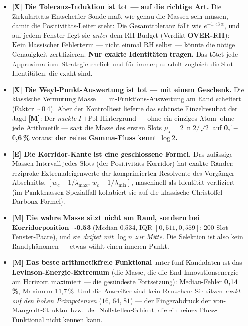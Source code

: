 \documentclass[11pt,a4paper]{article}
\newcommand{\E}{\textcolor{gut}{\textbf{[E]}}}
\newcommand{\M}{\textcolor{mess}{\textbf{[M]}}}
\begin{document}
\begin{itemize}
\item \textbf{[X] Die Toleranz-Induktion ist tot --- auf die
      richtige Art.} Die Zirkularitäts-Entscheider-Sonde maß, wie
      genau die Massen sein müssen, damit die Positivitäts-Leiter
      steht: Die Gesamttoleranz fällt wie $e^{-1{,}43\,\alpha}$,
      und auf jedem Fenster liegt sie \emph{unter} dem RH-Budget
      (Verdikt \textbf{OVER-RH}): Kein klassischer Fehlerterm ---
      nicht einmal RH selbst --- könnte die nötige Genauigkeit
      zertifizieren. \textbf{Nur exakte Identitäten tragen.} Das
      tötet jede Approximations-Strategie ehrlich und für immer;
      es adelt zugleich die Slot-Identitäten, die exakt sind.
\item \textbf{[X] Die Weyl-Punkt-Auswertung ist tot --- mit einem
      Geschenk.} Die klassische Vermutung \glqq{}Masse $=$
      m-Funktions-Auswertung am Rand\grqq{} scheitert
      (Faktor $\sim$0{,}4). Aber der Kontrolltest lieferte das
      schönste Einzelresultat der Jagd \M{}: Der \emph{nackte}
      $\Gamma$$+$Pol-Hintergrund --- ohne ein einziges Atom, ohne
      jede Arithmetik --- sagt die Masse des ersten Slots
      $\mu_2 = 2\ln 2/\sqrt{2}$ auf \textbf{0{,}1--0{,}6\,\%}
      voraus: \textbf{der reine Gamma-Fluss kennt $\log 2$.}
\item \E{} \textbf{Die Korridor-Kante ist eine geschlossene
      Formel.} Das zulässige Massen-Intervall jedes Slots (der
      \glqq{}Positivitäts-Korridor\grqq{}) hat exakte Ränder:
      reziproke Extremaleigenwerte der komprimierten Resolvente
      des Vorgänger-Abschnitts, $[w_c - 1/\lambda_{\max},\,
      w_c - 1/\lambda_{\min}]$, maschinell als Identität
      verifiziert (im Punktmassen-Spezialfall kollabiert sie auf
      die klassische Christoffel--Darboux-Formel).
\item \M{} \textbf{Die wahre Masse sitzt nicht am Rand, sondern
      bei Korridorposition $\sim$0{,}53} (Median 0{,}534,
      IQR $[0{,}511, 0{,}559]$; 200 Slot-Fenster-Paare), und sie
      \emph{driftet mit $\log n$ zur Mitte}. Die Selektion ist
      also kein Randphänomen --- etwas wählt einen inneren Punkt.
\item \M{} \textbf{Das beste arithmetikfreie Funktional} unter fünf
      Kandidaten ist das \textbf{Levinson-Energie-Extremum} (die
      Masse, die die End-Innovationsenergie am Horizont maximiert
      --- \glqq{}die gesündeste Fortsetzung\grqq{}): Median-Fehler
      \textbf{0{,}14\,\%}, Maximum 11{,}7\,\%. Und die Ausreißer
      sind kein Rauschen: Sie sitzen \emph{exakt auf den hohen
      Primpotenzen} ($16$, $64$, $81$) --- der Fingerabdruck der
      von-Mangoldt-Struktur bzw.\ der Nullstellen-Schicht, die ein
      reines Fluss-Funktional nicht kennen kann.
\end{itemize}
\end{document}
